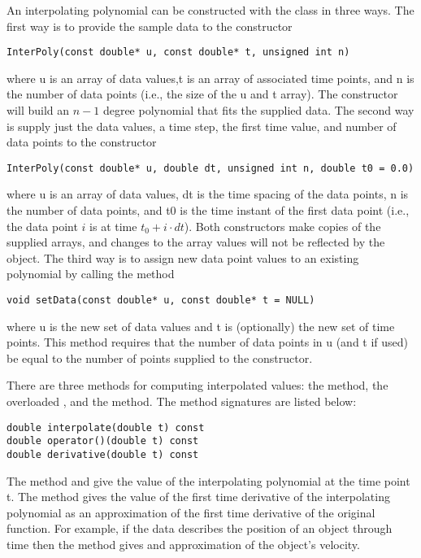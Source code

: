 An interpolating polynomial can be constructed with the  class in three ways. The first way is to provide the sample data to the  constructor
\begin{verbatim}
InterPoly(const double* u, const double* t, unsigned int n)
\end{verbatim}
where u is an array of data values,t is an array of associated time points, and n is the number of data points (i.e., the size of the u and t array). The constructor will build an $n-1$ degree polynomial that fits the supplied data. The second way is supply just the data values, a time step, the first time value, and number of data points to the constructor
\begin{verbatim}
InterPoly(const double* u, double dt, unsigned int n, double t0 = 0.0)
\end{verbatim}
where u is an array of data values, dt is the time spacing of the data points, n is the number of data points, and t0 is the time instant of the first data point (i.e., the data point $i$ is at time $t_0+i \cdot dt$). Both constructors make copies of the supplied arrays, and changes to the array values will not be reflected by the  object. The third way is to assign new data point values to an existing polynomial by calling the  method
\begin{verbatim}
void setData(const double* u, const double* t = NULL)
\end{verbatim}
where u is the new set of data values and t is (optionally) the new set of time points. This method requires that the number of data points in u (and t if used) be equal to the number of points supplied to the  constructor.

There are three methods for computing interpolated values: the  method, the overloaded , and the  method. The method signatures are listed below:
\begin{verbatim}
double interpolate(double t) const
double operator()(double t) const
double derivative(double t) const
\end{verbatim}
The  method and  give the value of the interpolating polynomial at the time point t. The  method gives the value of the first time derivative of the interpolating polynomial as an approximation of the first time derivative of the original function. For example, if the data describes the position of an object through time then the  method gives and approximation of the object's velocity.

